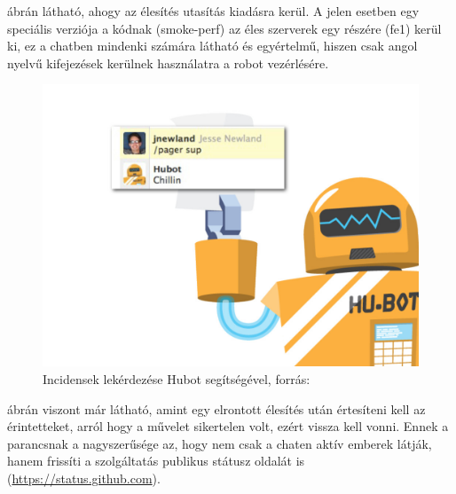  ábrán látható, ahogy az élesítés utasítás kiadásra kerül. A jelen esetben egy speciális verziója a kódnak (smoke-perf) az éles szerverek egy részére (fe1) kerül ki, ez a chatben mindenki számára látható és egyértelmű, hiszen csak angol nyelvű kifejezések kerülnek használatra a robot vezérlésére.

\begin{figure}[H]
  \centering
    \includegraphics[scale=1.4]{assets/pager_sup.jpg}%
    \caption[DUMMY]%
    {Incidensek lekérdezése Hubot segítségével, forrás: \cite[p.~83]{what_is_chatops_slideshow}}%
    \label{fig:pager_sup}
\end{figure}

 ábrán viszont már látható, amint egy elrontott élesítés után értesíteni kell az érintetteket, arról hogy a művelet sikertelen volt, ezért vissza kell vonni. Ennek a parancsnak a nagyszerűsége az, hogy nem csak a chaten aktív emberek látják, hanem frissíti a szolgáltatás publikus státusz oldalát is (\url{https://status.github.com}).


